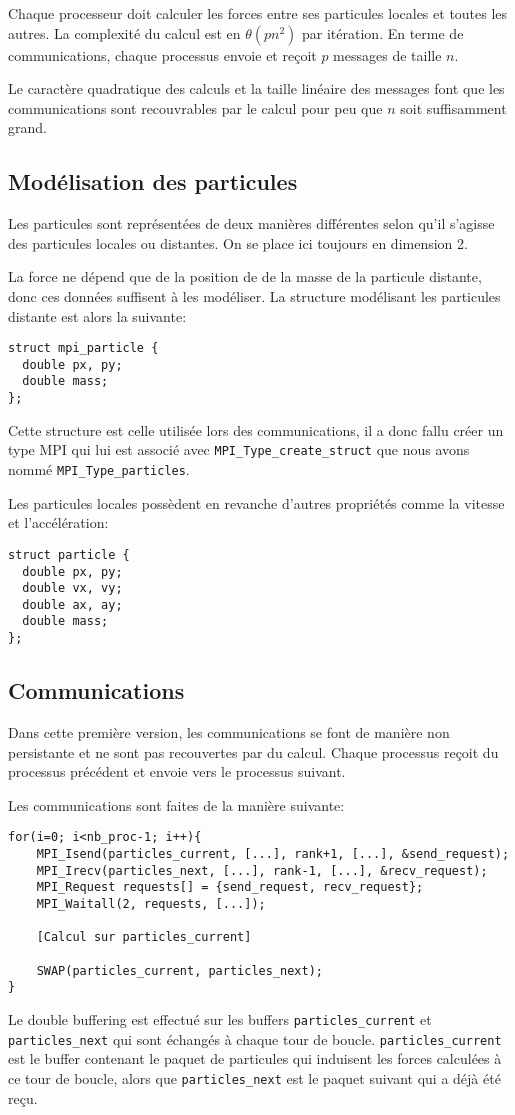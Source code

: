 Chaque processeur doit calculer les forces entre ses particules locales et toutes les autres. La complexité du calcul est en $\theta(pn^2)$ par itération. En terme de communications, chaque processus envoie et reçoit $p$ messages de taille $n$.

Le caractère quadratique des calculs et la taille linéaire des messages font que les communications sont recouvrables par le calcul pour peu que $n$ soit suffisamment grand.

\subsection{Modélisation des particules}

Les particules sont représentées de deux manières différentes selon qu'il s'agisse des particules locales ou distantes. On se place ici toujours en dimension 2.

La force ne dépend que de la position de de la masse de la particule distante, donc ces données suffisent à les modéliser. La structure modélisant les particules distante est alors la suivante:
\begin{verbatim}
struct mpi_particle {
  double px, py;
  double mass;
};
\end{verbatim}
Cette structure est celle utilisée lors des communications, il a donc fallu créer un type MPI qui lui est associé avec \texttt{MPI\_Type\_create\_struct} que nous avons nommé \texttt{MPI\_Type\_particles}.

Les particules locales possèdent en revanche d'autres propriétés comme la vitesse et l'accélération:
\begin{verbatim}
struct particle {
  double px, py;
  double vx, vy;
  double ax, ay;
  double mass;
};
\end{verbatim}

\subsection{Communications}

Dans cette première version, les communications se font de manière non persistante et ne sont pas recouvertes par du calcul. Chaque processus reçoit du processus précédent et envoie vers le processus suivant.

Les communications sont faites de la manière suivante:
\begin{verbatim}
for(i=0; i<nb_proc-1; i++){
    MPI_Isend(particles_current, [...], rank+1, [...], &send_request);
    MPI_Irecv(particles_next, [...], rank-1, [...], &recv_request);
    MPI_Request requests[] = {send_request, recv_request};
    MPI_Waitall(2, requests, [...]);
    
    [Calcul sur particles_current]
    
    SWAP(particles_current, particles_next);
}
\end{verbatim}
Le double buffering est effectué sur les buffers \texttt{particles\_current} et \texttt{particles\_next} qui sont échangés à chaque tour de boucle. \texttt{particles\_current} est le buffer contenant le paquet de particules qui induisent les forces calculées à ce tour de boucle, alors que \texttt{particles\_next} est le paquet suivant qui a déjà été reçu.


